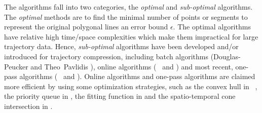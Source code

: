 The \lsa algorithms fall into two categories, \ie the \textit{optimal} and \textit{sub-optimal} algorithms.
The \textit{optimal} methods\cite{Imai:Optimal,Chan:Optimal} are to find the minimal number of points or segments to represent the original polygonal lines \wrt an error bound $\epsilon$.
%
The optimal \lsa algorithms have relative high time/space complexities which make them impractical for large trajectory data.
Hence, \textit{sub-optimal} \lsa algorithms have been developed and/or introduced for trajectory compression, including batch algorithms (\eg Douglas-Peucker \cite{Douglas:Peucker, Meratnia:Spatiotemporal, Cao:Spatio} and Theo~Pavlidis \cite{Pavlidis:Segment}), online algorithms (\eg~\bqsa\cite{Liu:BQS} and \squishe \cite{Muckell:Compression}) and most recent, one-pass algorithms (\eg~\operb \cite{Lin:Operb} and \cised \cite{Lin:Cised}). Online algorithms and one-pass algorithms are claimed more efficient by using some optimization strategies, such as the convex hull in \bqsa~\cite{Liu:BQS}, the priority queue in \squishe \cite{Muckell:Compression}, the {fitting function} in \operb \cite {Lin:Operb} and the spatio-temporal cone intersection in \cised \cite {Lin:Cised}.

